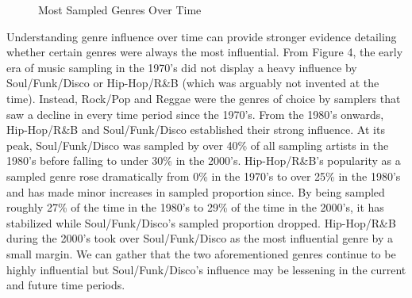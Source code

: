 \documentclass[pageno]{jpaper}
\begin{document}
\begin{figure}[H]
\caption{Most Sampled Genres Over Time}
\label{fig:fig4}
\centering
\end{figure}
Understanding genre influence over time can provide stronger evidence detailing whether certain genres were always the most influential. From Figure 4, the early era of music sampling in the 1970's did not display a heavy influence by Soul/Funk/Disco or Hip-Hop/R\&B (which was arguably not invented at the time). Instead, Rock/Pop and Reggae were the genres of choice by samplers that saw a decline in every time period since the 1970's. From the 1980's onwards, Hip-Hop/R\&B and Soul/Funk/Disco established their strong influence. At its peak, Soul/Funk/Disco was sampled by over 40\% of all sampling artists in the 1980's before falling to under 30\% in the 2000's. Hip-Hop/R\&B's popularity as a sampled genre rose dramatically from 0\% in the 1970's to over 25\% in the 1980's and has made minor increases in sampled proportion since. By being sampled roughly 27\% of the time in the 1980's to 29\% of the time in the 2000's, it has stabilized while Soul/Funk/Disco's sampled proportion dropped. Hip-Hop/R\&B during the 2000's took over Soul/Funk/Disco as the most influential genre by a small margin. We can gather that the two aforementioned genres continue to be highly influential but Soul/Funk/Disco's influence may be lessening in the current and future time periods.
\end{document}
